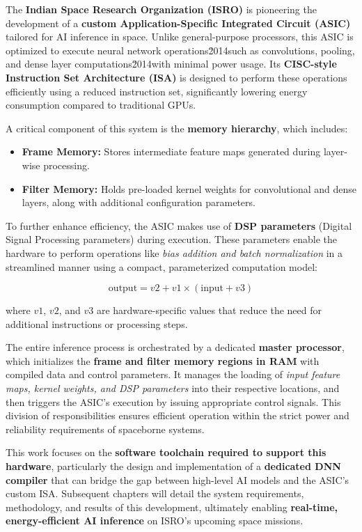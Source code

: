 \documentclass[12pt]{report}
\begin{document}
The \textbf{Indian Space Research Organization (ISRO)} is pioneering the development of a \textbf{custom Application-Specific Integrated Circuit (ASIC)} tailored for AI inference in space. Unlike general-purpose processors, this ASIC is optimized to execute neural network operations\u2014such as convolutions, pooling, and dense layer computations\u2014with minimal power usage. Its \textbf{CISC-style Instruction Set Architecture (ISA)} is designed to perform these operations efficiently using a reduced instruction set, significantly lowering energy consumption compared to traditional GPUs.

A critical component of this system is the \textbf{memory hierarchy}, which includes:
\begin{itemize}
    \item \textbf{Frame Memory:} Stores intermediate feature maps generated during layer-wise processing.
    \item \textbf{Filter Memory:} Holds pre-loaded kernel weights for convolutional and dense layers, along with additional configuration parameters.
\end{itemize}

To further enhance efficiency, the ASIC makes use of \textbf{DSP parameters} (Digital Signal Processing parameters) during execution. These parameters enable the hardware to perform operations like \textit{bias addition and batch normalization} in a streamlined manner using a compact, parameterized computation model:

\[
\text{output} = v2 + v1 \times (\text{input} + v3)
\]

where $v1$, $v2$, and $v3$ are hardware-specific values that reduce the need for additional instructions or processing steps.

The entire inference process is orchestrated by a dedicated \textbf{master processor}, which initializes the \textbf{frame and filter memory regions in RAM} with compiled data and control parameters. It manages the loading of \textit{input feature maps, kernel weights, and DSP parameters} into their respective locations, and then triggers the ASIC's execution by issuing appropriate control signals. This division of responsibilities ensures efficient operation within the strict power and reliability requirements of spaceborne systems.

This work focuses on the \textbf{software toolchain required to support this hardware}, particularly the design and implementation of a \textbf{dedicated DNN compiler} that can bridge the gap between high-level AI models and the ASIC's custom ISA. Subsequent chapters will detail the system requirements, methodology, and results of this development, ultimately enabling \textbf{real-time, energy-efficient AI inference} on ISRO's upcoming space missions.
\end{document}

